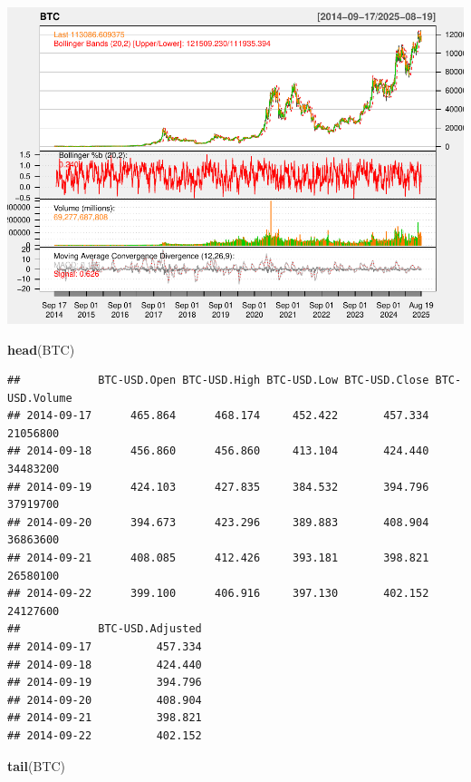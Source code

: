 \documentclass[
]{book}
\newenvironment{Shaded}{\begin{snugshade}}{\end{snugshade}}
\newcommand{\FunctionTok}[1]{\textcolor[rgb]{0.13,0.29,0.53}{\textbf{#1}}}
\newcommand{\NormalTok}[1]{#1}
\begin{document}
\includegraphics{Notas-Series-Tiempo_files/figure-latex/Data_ARCH-1.pdf}

\begin{Shaded}
\begin{Highlighting}[]
\FunctionTok{head}\NormalTok{(BTC)}
\end{Highlighting}
\end{Shaded}

\begin{verbatim}
##            BTC-USD.Open BTC-USD.High BTC-USD.Low BTC-USD.Close BTC-USD.Volume
## 2014-09-17      465.864      468.174     452.422       457.334       21056800
## 2014-09-18      456.860      456.860     413.104       424.440       34483200
## 2014-09-19      424.103      427.835     384.532       394.796       37919700
## 2014-09-20      394.673      423.296     389.883       408.904       36863600
## 2014-09-21      408.085      412.426     393.181       398.821       26580100
## 2014-09-22      399.100      406.916     397.130       402.152       24127600
##            BTC-USD.Adjusted
## 2014-09-17          457.334
## 2014-09-18          424.440
## 2014-09-19          394.796
## 2014-09-20          408.904
## 2014-09-21          398.821
## 2014-09-22          402.152
\end{verbatim}

\begin{Shaded}
\begin{Highlighting}[]
\FunctionTok{tail}\NormalTok{(BTC)}
\end{Highlighting}
\end{Shaded}
\end{document}
